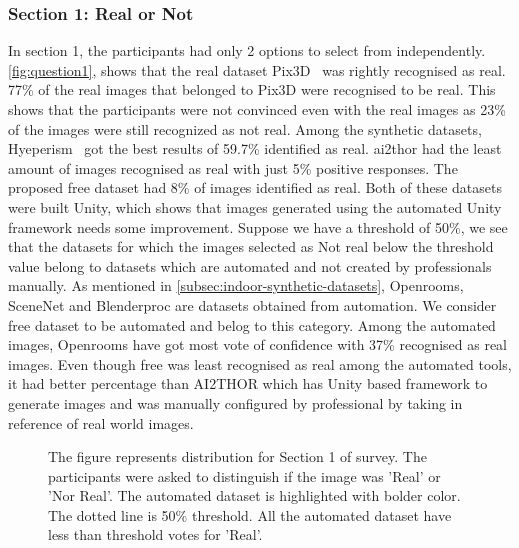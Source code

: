 \subsubsection{Section 1: Real or Not}
In section 1, the participants had only 2 options to select from independently.
\autoref{fig:question1}, shows that the real dataset Pix3D~\cite{pix3d} was rightly recognised as real.
77\% of the real images that belonged to Pix3D were recognised to be real.
This shows that the participants were not convinced even with the real images as 23\% of the images were still recognized as not real.
Among the synthetic datasets, Hyeperism~\cite{Roberts2020HypersimAP} got the best results of 59.7\% identified as real.
\gls{ai2thor} had the least amount of images recognised as real with just 5\% positive responses.
The proposed \gls{free} dataset had 8\% of images identified as real.
Both of these datasets were built Unity, which shows that images generated using the automated Unity framework needs some improvement.
Suppose we have a threshold of 50\%, we see that the datasets for which the images selected as Not real below the threshold value belong to datasets which are automated and not created by professionals manually.
As mentioned in \autoref{subsec:indoor-synthetic-datasets}, Openrooms, SceneNet and Blenderproc are datasets obtained from automation.
We consider \gls{free} dataset to be automated and belog to this category.
Among the automated images, Openrooms have got most vote of confidence with 37\% recognised as real images.
Even though \gls{free} was least recognised as real among the automated tools, it had better percentage than AI2THOR
which has Unity based framework to generate images and was manually configured by professional by taking in reference of real world images.

\begin{figure}
    \centering
    \resizebox{\textwidth}{!}{}
    \caption{The figure represents distribution for Section 1 of survey. The participants were asked to distinguish if the image was 'Real' or 'Nor Real'.
    The automated dataset is highlighted with bolder color. The dotted line is 50\% threshold. All the automated dataset have less than threshold votes for 'Real'.}
    \label{fig:question1}
\end{figure}

